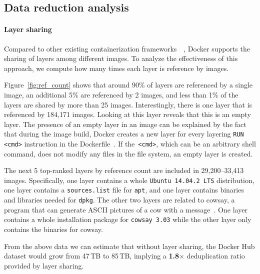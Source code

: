 \subsection{Data reduction analysis} 
\label{sec:dedup_ratio}

\paragraph{Layer sharing}

%
%
Compared to other existing containerization frameworks~\cite{openvz}~\cite{singularity},
Docker supports the sharing of layers among different images.
%
To analyze the effectiveness of this approach, we compute how many times
each layer is reference by images.

Figure~\ref{fig:ref_count} shows that around 90\% of layers are referenced by
a single image, an additional 5\% are referenced by 2 images, and less than
1\% of the layers are shared by more than 25 images.
%
Interestingly, there is one layer that is referenced by 184,171 images.  Looking at
this layer reveals that this is an empty layer.
%
The presence of an empty layer in an image can be explained
by the fact that during the image build, Docker creates a new layer
for every layering \texttt{RUN <cmd>} instruction
in the Dockerfile~\cite{Dockerfile}.
%
If the~\texttt{<cmd>}, which can be an arbitrary shell command,
does not modify any files in the file system,
an empty layer is created.
%

The next 5 top-ranked layers by reference count
are included in 29,200--33,413 images.
Specifically, one layer contains a whole \texttt{Ubuntu 14.04.2 LTS} distribution,
one layer contains a \texttt{sources.list} file for \texttt{apt},
and one layer contains binaries and libraries needed for \texttt{dpkg}.
The other two layers are related to cowsay, a program that can generate ASCII pictures of a cow with a message~\cite{cowsay}.
One layer contains a whole installation package for \texttt{cowsay 3.03} 
while the other layer only contains the binaries for cowsay.

From the above data we can estimate that without layer sharing, the Docker Hub
dataset would grow from 47\,TB to 85\,TB, implying a \textbf{1.8$\times$} deduplication
ratio provided by layer sharing.
 
